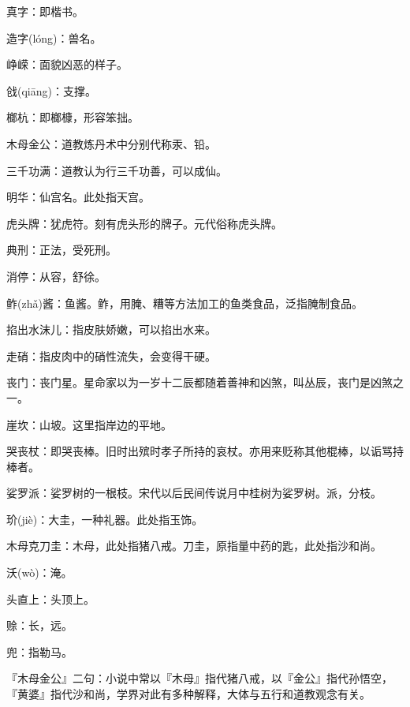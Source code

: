 \startbuffer[837]
真字：即楷书。
\stopbuffer


\startbuffer[838]
造字(lóng)：兽名。
\stopbuffer


\startbuffer[839]
峥嵘：面貌凶恶的样子。
\stopbuffer


\startbuffer[840]
戗(qiāng)：支撑。
\stopbuffer


\startbuffer[841]
榔杭：即榔槺，形容笨拙。
\stopbuffer


\startbuffer[842]
木母金公：道教炼丹术中分别代称汞、铅。
\stopbuffer


\startbuffer[843]
三千功满：道教认为行三千功善，可以成仙。
\stopbuffer


\startbuffer[844]
明华：仙宫名。此处指天宫。
\stopbuffer


\startbuffer[845]
虎头牌：犹虎符。刻有虎头形的牌子。元代俗称虎头牌。
\stopbuffer


\startbuffer[846]
典刑：正法，受死刑。
\stopbuffer


\startbuffer[847]
消停：从容，舒徐。
\stopbuffer


\startbuffer[848]
鲊(zhǎ)酱：鱼酱。鲊，用腌、糟等方法加工的鱼类食品，泛指腌制食品。
\stopbuffer


\startbuffer[849]
掐出水沫儿：指皮肤娇嫩，可以掐出水来。
\stopbuffer


\startbuffer[850]
走硝：指皮肉中的硝性流失，会变得干硬。
\stopbuffer


\startbuffer[851]
丧门：丧门星。星命家以为一岁十二辰都随着善神和凶煞，叫丛辰，丧门是凶煞之一。
\stopbuffer


\startbuffer[852]
崖坎：山坡。这里指岸边的平地。
\stopbuffer


\startbuffer[853]
哭丧杖：即哭丧棒。旧时出殡时孝子所持的哀杖。亦用来贬称其他棍棒，以诟骂持棒者。
\stopbuffer


\startbuffer[854]
娑罗派：娑罗树的一根枝。宋代以后民间传说月中桂树为娑罗树。派，分枝。
\stopbuffer


\startbuffer[855]
玠(jiè)：大圭，一种礼器。此处指玉饰。
\stopbuffer


\startbuffer[856]
木母克刀圭：木母，此处指猪八戒。刀圭，原指量中药的匙，此处指沙和尚。
\stopbuffer


\startbuffer[857]
沃(wò)：淹。
\stopbuffer


\startbuffer[858]
头直上：头顶上。
\stopbuffer


\startbuffer[859]
赊：长，远。
\stopbuffer


\startbuffer[860]
兜：指勒马。
\stopbuffer


\startbuffer[861]
『木母金公』二句：小说中常以『木母』指代猪八戒，以『金公』指代孙悟空，『黄婆』指代沙和尚，学界对此有多种解释，大体与五行和道教观念有关。
\stopbuffer


